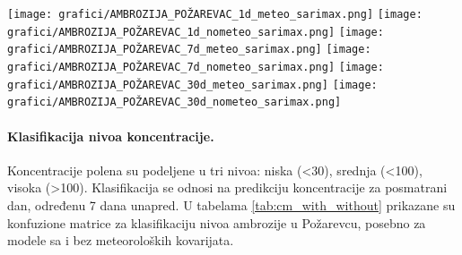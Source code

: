\documentclass[12pt]{article}
\begin{document}
\begin{center}
    \texttt{[image: grafici/AMBROZIJA\_POŽAREVAC\_1d\_meteo\_sarimax.png]}
    \vspace{0.3cm}
    \texttt{[image: grafici/AMBROZIJA\_POŽAREVAC\_1d\_nometeo\_sarimax.png]}
    \vspace{0.3cm}
    \texttt{[image: grafici/AMBROZIJA\_POŽAREVAC\_7d\_meteo\_sarimax.png]}
    \vspace{0.3cm}
    \texttt{[image: grafici/AMBROZIJA\_POŽAREVAC\_7d\_nometeo\_sarimax.png]}
    \vspace{0.3cm}
    \texttt{[image: grafici/AMBROZIJA\_POŽAREVAC\_30d\_meteo\_sarimax.png]}
    \vspace{0.3cm}
    \texttt{[image: grafici/AMBROZIJA\_POŽAREVAC\_30d\_nometeo\_sarimax.png]}
    \label{fig:sarimax_forecast_6x1}
\end{center}



\paragraph{\textbf{Klasifikacija nivoa koncentracije.}}  
Koncentracije polena su podeljene u tri nivoa: niska (<30), srednja (<100), visoka (>100).  
Klasifikacija se odnosi na predikciju koncentracije za posmatrani dan, određenu 7 dana unapred.  
U tabelama \ref{tab:cm_with_without} prikazane su konfuzione matrice za klasifikaciju nivoa ambrozije u Požarevcu, posebno za modele sa i bez meteoroloških kovarijata.
\end{document}

